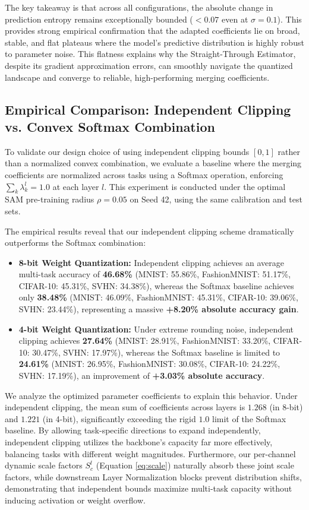 The key takeaway is that across all configurations, the absolute change in prediction entropy remains exceptionally bounded ($< 0.07$ even at $\sigma = 0.1$). This provides strong empirical confirmation that the adapted coefficients lie on broad, stable, and flat plateaus where the model's predictive distribution is highly robust to parameter noise. This flatness explains why the Straight-Through Estimator, despite its gradient approximation errors, can smoothly navigate the quantized landscape and converge to reliable, high-performing merging coefficients.

\subsection{Empirical Comparison: Independent Clipping vs. Convex Softmax Combination}
\label{sec:exp_softmax}
To validate our design choice of using independent clipping bounds $[0, 1]$ rather than a normalized convex combination, we evaluate a baseline where the merging coefficients are normalized across tasks using a Softmax operation, enforcing $\sum_k \lambda^l_k = 1.0$ at each layer $l$. This experiment is conducted under the optimal SAM pre-training radius $\rho = 0.05$ on Seed 42, using the same calibration and test sets.

The empirical results reveal that our independent clipping scheme dramatically outperforms the Softmax combination:
\begin{itemize}
    \item \textbf{8-bit Weight Quantization:} Independent clipping achieves an average multi-task accuracy of \textbf{46.68\%} (MNIST: 55.86\%, FashionMNIST: 51.17\%, CIFAR-10: 45.31\%, SVHN: 34.38\%), whereas the Softmax baseline achieves only \textbf{38.48\%} (MNIST: 46.09\%, FashionMNIST: 45.31\%, CIFAR-10: 39.06\%, SVHN: 23.44\%), representing a massive \textbf{+8.20\% absolute accuracy gain}.
    \item \textbf{4-bit Weight Quantization:} Under extreme rounding noise, independent clipping achieves \textbf{27.64\%} (MNIST: 28.91\%, FashionMNIST: 33.20\%, CIFAR-10: 30.47\%, SVHN: 17.97\%), whereas the Softmax baseline is limited to \textbf{24.61\%} (MNIST: 26.95\%, FashionMNIST: 30.08\%, CIFAR-10: 24.22\%, SVHN: 17.19\%), an improvement of \textbf{+3.03\% absolute accuracy}.
\end{itemize}
We analyze the optimized parameter coefficients to explain this behavior. Under independent clipping, the mean sum of coefficients across layers is $1.268$ (in 8-bit) and $1.221$ (in 4-bit), significantly exceeding the rigid $1.0$ limit of the Softmax baseline. By allowing task-specific directions to expand independently, independent clipping utilizes the backbone's capacity far more effectively, balancing tasks with different weight magnitudes. Furthermore, our per-channel dynamic scale factors $S^l_c$ (Equation \ref{eq:scale}) naturally absorb these joint scale factors, while downstream Layer Normalization blocks prevent distribution shifts, demonstrating that independent bounds maximize multi-task capacity without inducing activation or weight overflow.

